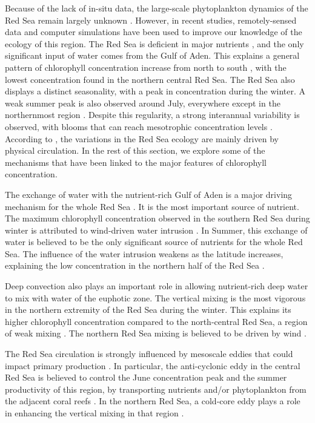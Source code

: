 Because of the lack of in-situ data, the large-scale phytoplankton dynamics of 
the Red Sea remain largely unknown \citep{Raitsos2013, Triantafyllou2014}. 
However, in recent studies, remotely-sensed data and computer simulations have 
been used to improve our knowledge of the ecology of this region. The Red Sea is 
deficient in major nutrients \citep{Weikert1987}, and the only significant input 
of water comes from the Gulf of Aden. This explains a general pattern of 
chlorophyll concentration increase from north to south \citep{Raitsos2013}, with 
the lowest concentration found in the northern central Red Sea. The Red Sea also 
displays a distinct seasonality, with a peak in concentration during the winter. 
A weak summer peak is also observed around July, everywhere except in the 
northernmost region \citep{Raitsos2013}. Despite this regularity, a strong 
interannual variability is observed, with blooms that can reach mesotrophic 
concentration levels \citep{Raitsos2013}. According to 
\citet{Triantafyllou2014}, the variations in the Red Sea ecology are mainly 
driven by physical circulation. In the rest of this section, we explore some of 
the mechanisms that have been linked to the major features of chlorophyll 
concentration.

The exchange of water with the nutrient-rich Gulf of Aden is a major driving 
mechanism for the whole Red Sea \citep{Triantafyllou2014}. It is the most 
important source of nutrient. The maximum chlorophyll concentration observed in 
the southern Red Sea during winter is attributed to wind-driven water intrusion 
\citep{Raitsos2013}. In Summer, this exchange of water is believed to be the 
only significant source of nutrients for the whole Red Sea. The influence of the 
water intrusion weakens as the latitude increases, explaining the low 
concentration in the northern half of the Red Sea \citep{Raitsos2013}.

Deep convection also plays an important role in allowing nutrient-rich deep 
water to mix with water of the euphotic zone. The vertical mixing is the most 
vigorous in the northern extremity of the Red Sea during the winter. This 
explains its higher chlorophyll concentration compared to the north-central Red 
Sea, a region of weak mixing \citep{Raitsos2013}. The northern Red Sea mixing is 
believed to be driven by wind \citep{Raitsos2013}.

The Red Sea circulation is strongly influenced by mesoscale eddies 
\citep{Yao2014, Zhan2014} that could impact primary production \citep{Zhai2013}. 
In particular, the anti-cyclonic eddy in the central Red Sea is believed to 
control the June concentration peak and the summer productivity of this region, 
by transporting nutrients and/or phytoplankton from the adjacent coral reefs 
\citep{Raitsos2013}. In the northern Red Sea, a cold-core eddy plays a role in 
enhancing the vertical mixing in that region \citep{Raitsos2013}.

